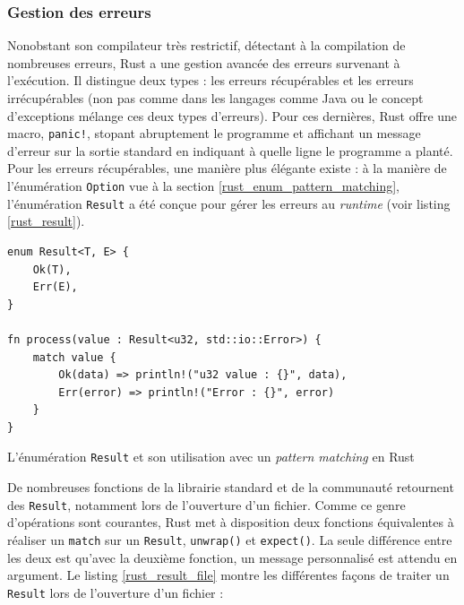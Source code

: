 \subsubsection{Gestion des erreurs} 
Nonobstant son compilateur très restrictif, détectant à la compilation de nombreuses erreurs, Rust 
a une gestion avancée des erreurs survenant à l'exécution. Il distingue deux types : les erreurs 
récupérables et les erreurs irrécupérables (non pas comme dans les langages comme Java ou le concept 
d'exceptions mélange ces deux types d'erreurs). Pour ces dernières, Rust offre une macro, 
\texttt{panic!}, stopant abruptement le programme et affichant un message d'erreur sur 
la sortie standard en indiquant à quelle ligne le programme a planté. Pour les erreurs récupérables, 
une manière plus élégante existe : à la manière de l'énumération \texttt{Option} vue à 
la section \ref{rust_enum_pattern_matching}, l'énumération \texttt{Result} a été conçue 
pour gérer les erreurs au \textit{runtime} (voir listing \ref{rust_result}).
\bigbreak
\begin{code}
    \begin{verbatim}
enum Result<T, E> {
    Ok(T),
    Err(E),
}

fn process(value : Result<u32, std::io::Error>) {
    match value {
        Ok(data) => println!("u32 value : {}", data),
        Err(error) => println!("Error : {}", error)
    }
}
    \end{verbatim}
    \caption{L'énumération \texttt{Result} et son utilisation avec un \textit{pattern matching} en Rust}
    \label{rust_result}
\end{code}
\bigbreak
De nombreuses fonctions de la librairie standard et de la communauté retournent des 
\texttt{Result}, notamment lors de l'ouverture d'un fichier. Comme ce genre d'opérations 
sont courantes, Rust met à disposition deux fonctions équivalentes à réaliser un \texttt{match} 
sur un \texttt{Result}, \texttt{unwrap()} et \texttt{expect()}. La 
seule différence entre les deux est qu'avec la deuxième fonction, un message personnalisé est 
attendu en argument. Le listing \ref{rust_result_file} montre les différentes façons de traiter un 
\texttt{Result} lors de l'ouverture d'un fichier :
